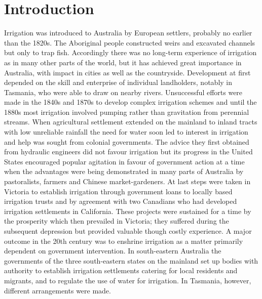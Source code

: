 
\chapter{Introduction}

Irrigation was introduced to Australia by European settlers, probably
no earlier than the 1820s.  The Aboriginal people constructed weirs
and excavated channels but only to trap fish.  Accordingly there was
no long-term experience of irrigation as in many other parts of the
world, but it has achieved great importance in Australia, with impact
in cities as well as the countryside.  Development at first depended
on the skill and enterprise of individual landholders, notably in
Tasmania, who were able to draw on nearby rivers.  Unsuccessful
efforts were made in the 1840s and 1870s to develop complex irrigation
schemes and until the 1880s most irrigation involved pumping rather
than gravitation from perennial streams.  When agricultural settlement
extended on the mainland to inland tracts with low unreliable rainfall
the need for water soon led to interest in irrigation and help was
sought from colonial governments.  The advice they first obtained from
hydraulic engineers did not favour irrigation but its progress in the
United States encouraged popular agitation in favour of government
action at a time when the advantages were being demonstrated in many
parts of Australia by pastoralists, farmers and Chinese
market-gardeners.  At last steps were taken in Victoria to establish
irrigation through government loans to locally based irrigation trusts
and by agreement with two Canadians who had developed irrigation
settlements in California.  These projects were sustained for a time
by the prosperity which then prevailed in Victoria; they suffered
during the subsequent depression but provided valuable though costly
experience.  A major outcome in the 20th century was to enshrine
irrigation as a matter primarily dependent on government intervention.
In south-eastern Australia the governments of the three south-eastern
states on the mainland set up bodies with authority to establish
irrigation settlements catering for local residents and migrants, and
to regulate the use of water for irrigation.  In Tasmania, however,
different arrangements were made.

